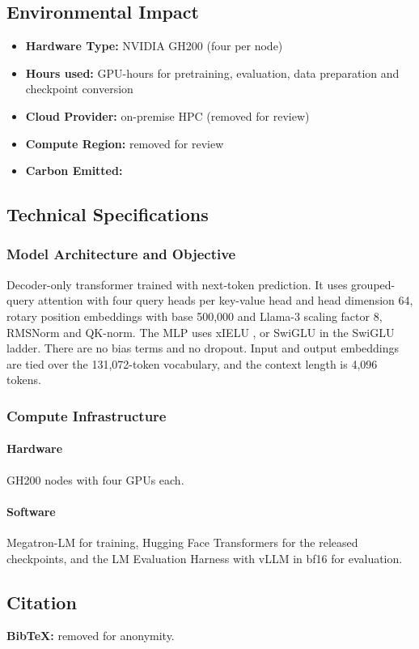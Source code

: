 \subsection*{Environmental Impact}

\begin{itemize}[itemsep=1pt,topsep=2pt]
    \item \textbf{Hardware Type:} NVIDIA GH200 (four per node)
    \item \textbf{Hours used:} \ngpuhours GPU-hours for pretraining, evaluation, data preparation and checkpoint conversion
    \item \textbf{Cloud Provider:} on-premise HPC (removed for review)
    \item \textbf{Compute Region:} removed for review
    \item \textbf{Carbon Emitted:} 
\end{itemize}

\subsection*{Technical Specifications}

\subsubsection*{Model Architecture and Objective}

Decoder-only transformer trained with next-token prediction. It uses grouped-query attention with four query heads per key-value head and head dimension 64, rotary position embeddings with base 500,000 and Llama-3 scaling factor 8, RMSNorm and QK-norm. The MLP uses xIELU \citep{huang_xielu_2025}, or SwiGLU in the SwiGLU ladder. There are no bias terms and no dropout. Input and output embeddings are tied over the 131,072-token vocabulary, and the context length is 4,096 tokens.

\subsubsection*{Compute Infrastructure}

\paragraph{Hardware}

GH200 nodes with four GPUs each.

\paragraph{Software}

Megatron-LM \citep{shoeybi_megatron-lm_2019} for training, Hugging Face Transformers for the released checkpoints, and the LM Evaluation Harness with vLLM in bf16 for evaluation.

\subsection*{Citation}

\textbf{BibTeX:} removed for anonymity.
